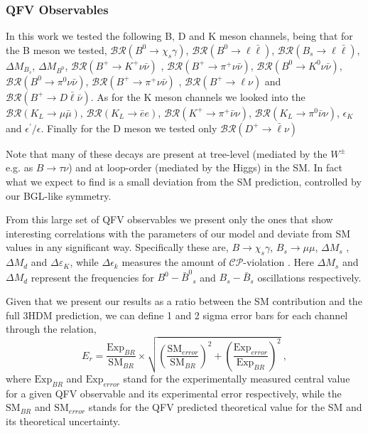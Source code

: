 \documentclass[10pt]{report}
\begin{document}
\subsubsection{QFV Observables}
%
In this work we tested the following B, D and K meson channels, being that for the B meson we tested, 
%
$\mathcal{BR} \left( B^0 \rightarrow \chi_s \gamma \right)$, 
$\mathcal{BR} \left( B^0 \rightarrow \ell \bar{\ell} \right)$, 
$\mathcal{BR} \left( B_s \rightarrow \ell \bar{\ell} \right)$, 
$\Delta M_{B_s}$, 
$\Delta M_{B^0}$, 
$\mathcal{BR} \left( B^+ \rightarrow K^+\nu\bar{\nu} \right)$ , 
$\mathcal{BR} \left( B^+ \rightarrow \pi^+\nu\bar{\nu} \right)$, 
$\mathcal{BR} \left( B^0 \rightarrow K^0\nu\bar{\nu} \right)$,  
$\mathcal{BR} \left( B^0 \rightarrow \pi^0 \nu\bar{\nu} \right)$, 
$\mathcal{BR} \left( B^+ \rightarrow \pi^+\nu\bar{\nu} \right)$ , 
$\mathcal{BR} \left( B^+ \rightarrow \ell \nu \right)$ and
$\mathcal{BR} \left( B^+ \rightarrow D \bar{\ell} \bar{\nu} \right)$. 
%
As for the K meson channels we looked into the $\mathcal{BR} \left( K_L \rightarrow \mu \bar{\mu} \right)$,  $\mathcal{BR} \left( K_L \rightarrow \bar{e} e \right)$,  $\mathcal{BR} \left( K^+ \rightarrow \pi^+ \bar{\nu} \nu \right)$, $\mathcal{BR} \left( K_L \rightarrow \pi^0 \bar{\nu} \nu \right)$, $\epsilon_K$ and $\epsilon^\prime/\epsilon$. 
%
Finally for the D meson we tested only $\mathcal{BR} ( D^+ \rightarrow \bar{\ell} \nu ) $

Note that many of these decays are present at tree-level (mediated by the $W^\pm$ e.g. as $B \rightarrow \tau \nu$) and at loop-order (mediated by the Higgs) in the SM. 
%
In fact what we expect to find is a small deviation from the SM prediction, controlled by our BGL-like symmetry. 

From this large set of QFV observables we present only the ones that show interesting correlations with the parameters of our model and deviate from SM values in any significant way.
%
Specifically these are, $B \rightarrow \chi_s \gamma$, $B_s \rightarrow \mu \mu$, $\Delta M_s$ , $\Delta M_d$ and $\Delta \varepsilon_K$, while $\Delta \epsilon_k$ measures the amount of $\mathcal{CP}$-violation . 
%
Here $\Delta M_s$ and $\Delta M_d$ represent the frequencies for ${B^0} - {\bar{B}^0}_s$ and ${B_s} - {\bar{B}_s}$ oscillations respectively. 

Given that we present our results as a ratio between the SM contribution and the full 3HDM prediction, we can define 1 and 2 sigma error bars for each channel through the relation, 
%
\begin{equation}
E_r = \frac{\text{Exp}_{BR}}{\text{SM}_{BR}} \times \sqrt{ \left(\frac{\text{SM}_{error}}{\text{SM}_{BR}}\right)^2 + \left( \frac{\text{Exp}_{error}}{\text{Exp}_{BR}} \right)^2} \ , 
\end{equation} 
%
where $\text{Exp}_{BR}$ and $\text{Exp}_{error}$ stand for the experimentally measured central value for a given QFV observable and its experimental error respectively, while the $\text{SM}_{BR}$ and $\text{SM}_{error}$ stands for the QFV predicted theoretical value for the SM and its theoretical uncertainty. 
\end{document}
